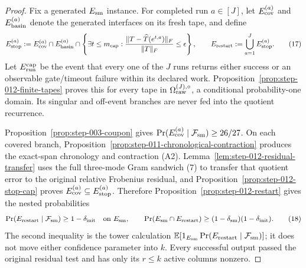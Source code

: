 \begin{proof}
Fix a generated \(E_{\rm sm}\) instance.  For completed run
\(a\in[J]\), let \(E_{\rm cov}^{(a)}\) and \(E_{\rm basin}^{(a)}\) denote
the generated interfaces on its fresh tape, and define
\[
 E_{\rm stop}^{(a)}:=E_{\rm cov}^{(a)}\cap E_{\rm basin}^{(a)}\cap
 \left\{\exists t\le m_{\rm cap}:
 {\|T-\widehat T(e^{t,a})\|_F\over\|T\|_F}\le\epsilon\right\},
 \qquad
 E_{\rm restart}:=\bigcup_{a=1}^J E_{\rm stop}^{(a)}.
\tag{17}
\]
Let \(E_{\rm run}^{\rm cap}\) be the event that every one of the \(J\) runs
returns either success or an observable gate/timeout failure within its
declared work.  Proposition~\ref{prop:step-012-finite-tapes} proves this for
every tape in \(\Omega_{\rm raw}^{(J),\circ}\), a conditional
probability-one domain.  Its singular and off-event branches are never fed
into the quotient recurrence.

Proposition~\ref{prop:step-003-coupon} gives
\(\Pr(E_{\rm cov}^{(a)}\mid{\cal F}_{\rm sm})\ge26/27\).  On each covered
branch, Proposition~\ref{prop:step-011-chronological-contraction} produces
the exact-span chronology and contraction (A2).
Lemma~\ref{lem:step-012-residual-transfer}
uses the full three-mode Gram sandwich (7) to transfer that quotient error to
the original relative Frobenius residual, and
Proposition~\ref{prop:step-012-stop-cap} proves
\(E_{\rm cov}^{(a)}\subseteq E_{\rm stop}^{(a)}\).  Therefore
Proposition~\ref{prop:step-012-restart} gives the nested probabilities
\[
 \Pr(E_{\rm restart}\mid{\cal F}_{\rm sm})\ge1-\delta_{\rm init}
 \quad\text{on }E_{\rm sm},
 \qquad
 \Pr(E_{\rm sm}\cap E_{\rm restart})
 \ge(1-\delta_{\rm sm})(1-\delta_{\rm init}).
\tag{18}
\]
The second inequality is the tower calculation
\(\mathbb E[1_{E_{\rm sm}}
\Pr(E_{\rm restart}\mid{\cal F}_{\rm sm})]\); it does not move either
confidence parameter into \(k\).  Every successful output passed the original
residual test and has only its \(r\le k\) active columns nonzero.


\end{proof}
